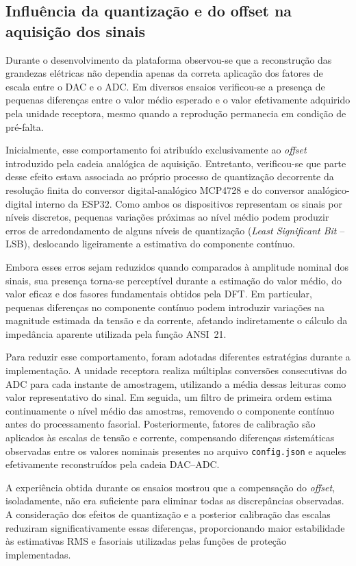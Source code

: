 \subsection{Influência da quantização e do offset na aquisição dos sinais}

Durante o desenvolvimento da plataforma observou-se que a reconstrução das grandezas elétricas não dependia apenas da correta aplicação dos fatores de escala entre o DAC e o ADC. Em diversos ensaios verificou-se a presença de pequenas diferenças entre o valor médio esperado e o valor efetivamente adquirido pela unidade receptora, mesmo quando a reprodução permanecia em condição de pré-falta.

Inicialmente, esse comportamento foi atribuído exclusivamente ao \textit{offset} introduzido pela cadeia analógica de aquisição. Entretanto, verificou-se que parte desse efeito estava associada ao próprio processo de quantização decorrente da resolução finita do conversor digital-analógico MCP4728 e do conversor analógico-digital interno da ESP32. Como ambos os dispositivos representam os sinais por níveis discretos, pequenas variações próximas ao nível médio podem produzir erros de arredondamento de alguns níveis de quantização (\textit{Least Significant Bit} -- LSB), deslocando ligeiramente a estimativa do componente contínuo.

Embora esses erros sejam reduzidos quando comparados à amplitude nominal dos sinais, sua presença torna-se perceptível durante a estimação do valor médio, do valor eficaz e dos fasores fundamentais obtidos pela DFT. Em particular, pequenas diferenças no componente contínuo podem introduzir variações na magnitude estimada da tensão e da corrente, afetando indiretamente o cálculo da impedância aparente utilizada pela função ANSI~21.

Para reduzir esse comportamento, foram adotadas diferentes estratégias durante a implementação. A unidade receptora realiza múltiplas conversões consecutivas do ADC para cada instante de amostragem, utilizando a média dessas leituras como valor representativo do sinal. Em seguida, um filtro de primeira ordem estima continuamente o nível médio das amostras, removendo o componente contínuo antes do processamento fasorial. Posteriormente, fatores de calibração são aplicados às escalas de tensão e corrente, compensando diferenças sistemáticas observadas entre os valores nominais presentes no arquivo \texttt{config.json} e aqueles efetivamente reconstruídos pela cadeia DAC--ADC.

A experiência obtida durante os ensaios mostrou que a compensação do \textit{offset}, isoladamente, não era suficiente para eliminar todas as discrepâncias observadas. A consideração dos efeitos de quantização e a posterior calibração das escalas reduziram significativamente essas diferenças, proporcionando maior estabilidade às estimativas RMS e fasoriais utilizadas pelas funções de proteção implementadas.

